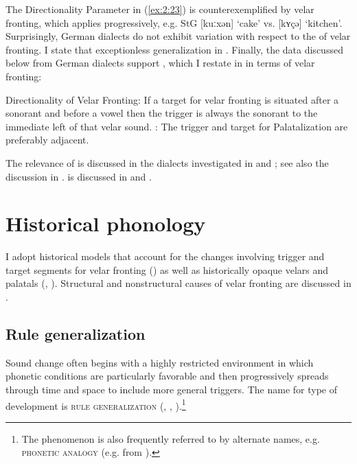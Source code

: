 \begin{xlist}
\begin{xlist}
The Directionality Parameter in (\ref{ex:2:23}) is counterexemplified by velar fronting, which applies progressively, e.g. StG [kuːxən] ‘cake’ vs. [kʏçə] ‘kitchen’. Surprisingly, German dialects do not exhibit variation with respect to the  of velar fronting. I state that exceptionless generalization in . Finally, the data discussed below from German dialects support , which I restate in  in terms of velar fronting:

\eanoraggedright%
    \label{ex:2:25}
          Directionality of Velar Fronting: If a target for velar fronting is situated after a sonorant and before a vowel then the trigger is always the sonorant to the immediate left of that velar sound.
\ex%
    \label{ex:2:26}
          : The trigger and target for Palatalization are preferably adjacent.
\z

The relevance of  is discussed in the dialects investigated in  and ; see also the discussion in .  is discussed in  and .

\section{{Historical} {phonology}}\label{sec:2.4}

I adopt historical models that account for the changes involving trigger and target segments for velar fronting () as well as historically opaque velars and palatals (, ). Structural and nonstructural causes of velar fronting are discussed in .

\subsection{Rule generalization}\label{sec:2.4.1}
\begin{sloppypar}
Sound change often begins with a highly restricted environment in which phonetic conditions are particularly favorable and then progressively spreads through time and space to include more general triggers. The name for type of development is \textsc{rule} \textsc{generalization} (\citealt{Vennemann1978}, \citealt{Bermúdez-Otero2015}, \citealt{Hinskens2021}).\footnote{The phenomenon is also frequently referred to by alternate names, e.g. \textsc{phonetic} \textsc{analogy} (e.g. \citealt{Benware1996} from \citealt{Schuchardt1885}).}
\end{sloppypar}


\end{xlist}
\end{xlist}
